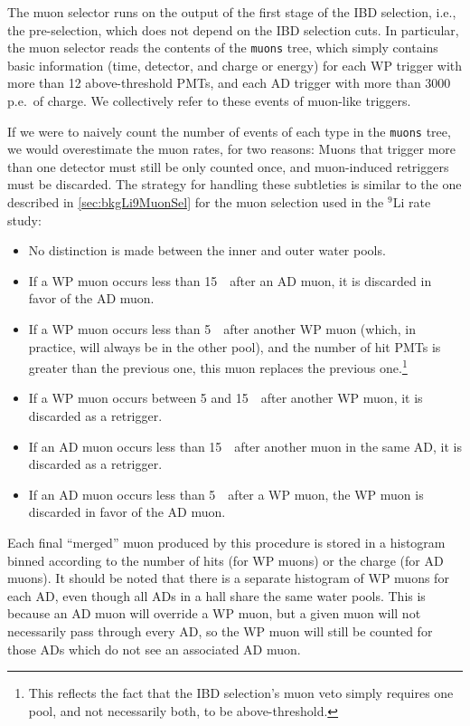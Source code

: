 \documentclass[../thesis.tex]{subfiles}
\begin{document}
The muon selector runs on the output of the first stage of the IBD selection, i.e., the pre-selection, which does not depend on the IBD selection cuts. In particular, the muon selector reads the contents of the \texttt{muons} tree, which simply contains basic information (time, detector, and charge or energy) for each WP trigger with more than 12 above-threshold PMTs, and each AD trigger with more than 3000 p.e.\ of charge. We collectively refer to these events of muon-like triggers.

If we were to naively count the number of events of each type in the \texttt{muons} tree, we would overestimate the muon rates, for two reasons: Muons that trigger more than one detector must still be only counted once, and muon-induced retriggers must be discarded. The strategy for handling these subtleties is similar to the one described in \autoref{sec:bkgLi9MuonSel} for the muon selection used in the $^9$Li rate study:

\begin{itemize}
\item No distinction is made between the inner and outer water pools.
\item If a WP muon occurs less than 15~\us\ after an AD muon, it is discarded in favor of the AD muon.
\item If a WP muon occurs less than 5~\us\ after another WP muon (which, in practice, will always be in the other pool), and the number of hit PMTs is greater than the previous one, this muon replaces the previous one.\footnote{This reflects the fact that the IBD selection's muon veto simply requires one pool, and not necessarily both, to be above-threshold.}
\item If a WP muon occurs between 5 and 15~\us\ after another WP muon, it is discarded as a retrigger.
\item If an AD muon occurs less than 15~\us\ after another muon in the same AD, it is discarded as a retrigger.
\item If an AD muon occurs less than 5~\us\ after a WP muon, the WP muon is discarded in favor of the AD muon.
\end{itemize}

Each final ``merged'' muon produced by this procedure is stored in a histogram binned according to the number of hits (for WP muons) or the charge (for AD muons). It should be noted that there is a separate histogram of WP muons for each AD, even though all ADs in a hall share the same water pools. This is because an AD muon will override a WP muon, but a given muon will not necessarily pass through every AD, so the WP muon will still be counted for those ADs which do not see an associated AD muon.
\end{document}
